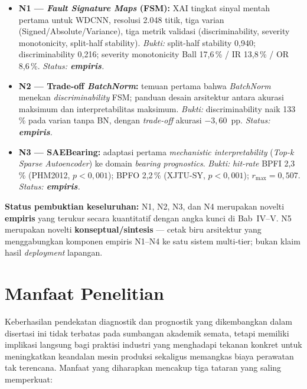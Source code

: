 \begin{itemize}
  \item \textbf{N1 — \emph{Fault Signature Maps} (FSM):} XAI tingkat
        sinyal mentah pertama untuk WDCNN, resolusi 2.048 titik, tiga
        varian (Signed/Absolute/Variance), tiga metrik validasi
        (discriminability, severity monotonicity, split-half stability).
        \emph{Bukti:} split-half stability 0,940; discriminability
        0,216; severity monotonicity Ball 17,6\,\% / IR 13,8\,\% /
        OR 8,6\,\%. \emph{Status: \textbf{empiris}.}

  \item \textbf{N2 — Trade-off \emph{BatchNorm}:} temuan pertama
        bahwa \emph{BatchNorm} menekan \emph{discriminability} FSM;
        panduan desain arsitektur antara akurasi maksimum dan
        interpretabilitas maksimum.
        \emph{Bukti:} discriminability naik 133\,\% pada varian
        tanpa BN, dengan \emph{trade-off} akurasi $-3{,}60$~pp.
        \emph{Status: \textbf{empiris}.}

  \item \textbf{N3 — SAEBearing:} adaptasi pertama
        \emph{mechanistic interpretability} (\emph{Top-k Sparse
        Autoencoder}) ke domain \emph{bearing prognostics}.
        \emph{Bukti:} \emph{hit-rate} BPFI 2,3\,\% (PHM2012,
        $p < 0{,}001$); BPFO 2,2\,\% (XJTU-SY, $p < 0{,}001$);
        $r_{\max} = 0{,}507$.
        \emph{Status: \textbf{empiris}.}
\end{itemize}

\noindent\textbf{Status pembuktian keseluruhan:} N1, N2, N3, dan N4
merupakan novelti \textbf{empiris} yang terukur secara kuantitatif
dengan angka kunci di Bab~IV–V.
N5 merupakan novelti \textbf{konseptual/sintesis} --- cetak biru
arsitektur yang menggabungkan komponen empiris N1–N4 ke satu sistem
multi-tier; bukan klaim hasil \emph{deployment} lapangan.


\section{Manfaat Penelitian}
\label{sec:bab1_manfaat}

Keberhasilan pendekatan diagnostik dan prognostik yang dikembangkan
dalam disertasi ini tidak terbatas pada sumbangan akademik semata,
tetapi memiliki implikasi langsung bagi praktisi industri yang
menghadapi tekanan konkret untuk meningkatkan keandalan mesin produksi
sekaligus memangkas biaya perawatan tak terencana.
Manfaat yang diharapkan mencakup tiga tataran yang saling memperkuat:

